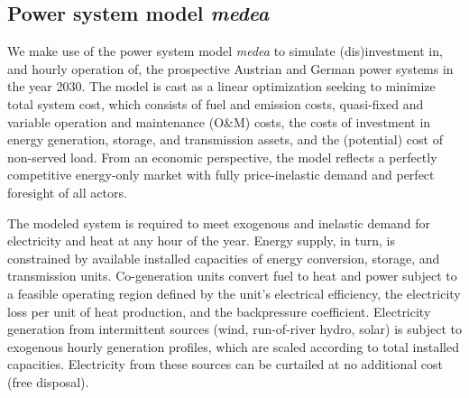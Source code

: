 \documentclass[review, 3p, times, 12pt, authoryear]{elsarticle}
\begin{document}

    \subsection{Power system model \emph{medea}} \label{subsec:medea}
    We make use of the power system model \emph{medea} to simulate (dis)investment in, and hourly operation of, the prospective Austrian and German power systems in the year 2030.
    The model is cast as a linear optimization seeking to minimize total system cost, which consists of fuel and emission costs, quasi-fixed and variable operation and maintenance (O\&M) costs, the costs of investment in energy generation, storage, and transmission assets, and the (potential) cost of non-served load.
    From an economic perspective, the model reflects a perfectly competitive energy-only market with fully price-inelastic demand and perfect foresight of all actors.

    The modeled system is required to meet exogenous and inelastic demand for electricity and heat at any hour of the year.
    Energy supply, in turn, is constrained by available installed capacities of energy conversion, storage, and transmission units.
    Co-generation units convert fuel to heat and power subject to a feasible operating region defined by the unit's electrical efficiency, the electricity loss per unit of heat production, and the backpressure coefficient.
    Electricity generation from intermittent sources (wind, run-of-river hydro, solar) is subject to exogenous hourly generation profiles, which are scaled according to total installed capacities.
    Electricity from these sources can be curtailed at no additional cost (free disposal).
\end{document}
